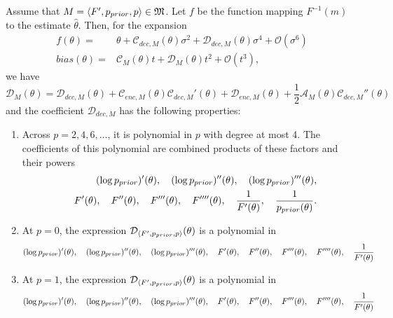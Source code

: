 \begin{lemma}\label{lemma:d-formula}\label{lemma:decoding-function-expansion}
Assume that $M = \langle F', p_{prior}, p\rangle \in \mathfrak{M}$.
Let $f$ be the function mapping $F^{-1}(m)$ to the estimate $\widehat{\theta}$.
Then, for the expansion
\begin{align*}
f(\theta) =& \theta + \mathcal{C}_{dec,M}(\theta) \sigma^2 + \mathcal{D}_{dec,M}(\theta) \sigma^4 + \mathcal{O}(\sigma^6)     \\
    bias(\theta) =& \mathcal{C}_{M}(\theta)t + \mathcal{D}_{M}(\theta)t^2 + \mathcal{O}(t^3),
\end{align*}
we have
\begin{equation}\label{eq:dm-decomposition}
    \mathcal{D}_M(\theta) = \mathcal{D}_{dec,M}(\theta) + \mathcal{C}_{enc,M}(\theta) \mathcal{C}_{dec,M}'(\theta) +  \mathcal{D}_{enc,M}(\theta) +  \frac{1}{2}  \mathcal{A}_M(\theta)   \mathcal{C}_{dec,M}''(\theta)
\end{equation}
and the coefficient $\mathcal{D}_{dec,M}$ has the following properties:
    \begin{enumerate}
        \item Across $p=2,4,6,\dots$, it is polynomial in $p$ with degree at most 4. The coefficients of this polynomial are combined products of these factors and their powers 
        \begin{align*}
            (\log p_{prior})'(\theta), \quad (\log p_{prior})''(\theta), \quad (\log p_{prior})'''(\theta), \\
\quad F'(\theta), \quad F''(\theta), \quad F'''(\theta), \quad F''''(\theta), \quad \frac{1}{F'(\theta)}, \quad \frac{1}{p_{prior}(\theta)}.
        \end{align*}
        
        \item At $p=0$, the expression $\mathcal{D}_{\langle F', p_{prior}, p\rangle}(\theta)$ is a polynomial in
        \[
            (\log p_{prior})'(\theta), \quad (\log p_{prior})''(\theta), \quad (\log p_{prior})'''(\theta), \quad F'(\theta), \quad F''(\theta), \quad F'''(\theta), \quad F''''(\theta), \quad \frac{1}{F'(\theta)}
        \]
        
        \item At $p=1$, the expression $\mathcal{D}_{\langle F', p_{prior}, p\rangle}(\theta)$ is a polynomial in
        \[
            (\log p_{prior})'(\theta), \quad (\log p_{prior})''(\theta), \quad (\log p_{prior})'''(\theta), \quad F'(\theta), \quad F''(\theta), \quad F'''(\theta), \quad F''''(\theta), \quad \frac{1}{F'(\theta)}
        \]
    \end{enumerate}
\end{lemma}

